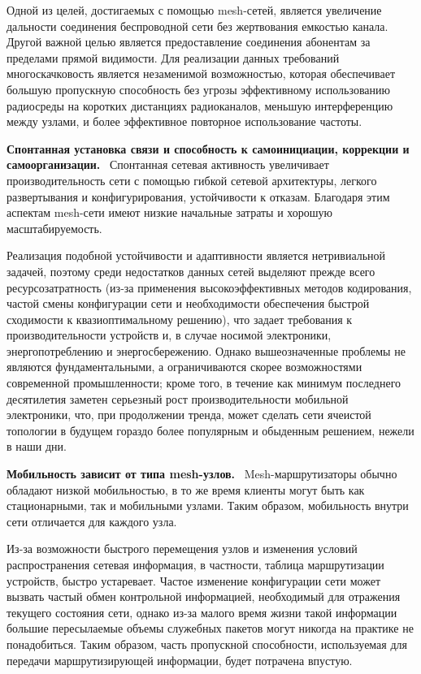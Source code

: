 \documentclass[14pt,a4paper,titlepage]{extarticle}
\renewcommand{\paragraph}[1]{\textbf{#1.}~}
\begin{document}
Одной из целей, достигаемых с помощью mesh-сетей, является увеличение дальности соединения беспроводной сети без жертвования емкостью канала. Другой важной целью является предоставление соединения абонентам за пределами прямой видимости. Для реализации данных требований многоскачковость является незаменимой возможностью, которая обеспечивает большую пропускную способность без угрозы эффективному использованию радиосреды на коротких дистанциях радиоканалов, меньшую интерференцию между узлами, и более эффективное повторное использование частоты. 

\paragraph{Спонтанная установка связи и способность к самоинициации, коррекции и самоорганизации}
Спонтанная сетевая активность увеличивает производительность сети с помощью гибкой сетевой архитектуры, легкого развертывания и конфигурирования, устойчивости к отказам. Благодаря этим аспектам mesh-сети имеют низкие начальные затраты и хорошую масштабируемость.

Реализация подобной устойчивости и адаптивности является нетривиальной задачей, поэтому среди недостатков данных сетей выделяют прежде всего ресурсозатратность (из-за применения высокоэффективных методов кодирования, частой смены конфигурации сети и необходимости обеспечения быстрой сходимости к  квазиоптимальному решению), что задает требования к производительности устройств и, в случае носимой электроники, энергопотреблению и энергосбережению. Однако вышеозначенные проблемы не являются фундаментальными, а ограничиваются скорее возможностями современной промышленности; кроме того, в течение как минимум последнего десятилетия заметен серьезный рост производительности мобильной электроники, что, при продолжении тренда, может сделать сети ячеистой топологии в будущем гораздо более популярным и обыденным решением, нежели в наши дни.

\paragraph{Мобильность зависит от типа mesh-узлов}
Mesh-маршрутизаторы обычно обладают низкой мобильностью, в то же время клиенты могут быть как стационарными, так и мобильными узлами. Таким образом, мобильность внутри сети отличается для каждого узла.

Из-за возможности быстрого перемещения узлов и изменения условий распространения сетевая информация, в частности, таблица маршрутизации устройств, быстро устаревает. Частое изменение конфигурации сети может вызвать частый обмен контрольной информацией, необходимый для отражения текущего состояния сети, однако из-за малого время жизни такой информации большие пересылаемые объемы служебных пакетов могут никогда на практике не понадобиться. Таким образом, часть пропускной способности, используемая для передачи маршрутизирующей информации, будет потрачена впустую. 
\end{document}
